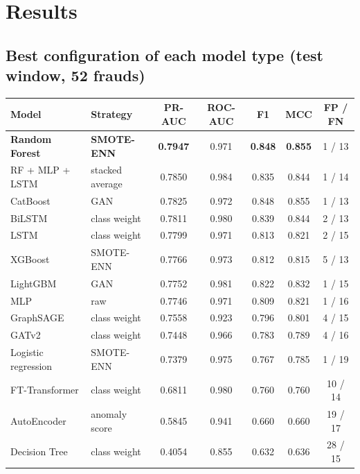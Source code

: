 \documentclass[11pt,a4paper]{article}
\begin{document}
\section{Results}
\subsection{Best configuration of each model type (test window, 52 frauds)}
{\footnotesize
\begin{center}
\begin{tabular}{@{}llccccc@{}}
\toprule
Model & Strategy & PR-AUC & ROC-AUC & F1 & MCC & FP / FN \\
\midrule
\textbf{Random Forest} & \textbf{SMOTE-ENN} & \textbf{0.7947} & 0.971 & \textbf{0.848} & \textbf{0.855} & 1 / 13 \\
RF + MLP + LSTM & stacked average & 0.7850 & 0.984 & 0.835 & 0.844 & 1 / 14 \\
CatBoost & GAN & 0.7825 & 0.972 & 0.848 & 0.855 & 1 / 13 \\
BiLSTM & class weight & 0.7811 & 0.980 & 0.839 & 0.844 & 2 / 13 \\
LSTM & class weight & 0.7799 & 0.971 & 0.813 & 0.821 & 2 / 15 \\
XGBoost & SMOTE-ENN & 0.7766 & 0.973 & 0.812 & 0.815 & 5 / 13 \\
LightGBM & GAN & 0.7752 & 0.981 & 0.822 & 0.832 & 1 / 15 \\
MLP & raw & 0.7746 & 0.971 & 0.809 & 0.821 & 1 / 16 \\
GraphSAGE & class weight & 0.7558 & 0.923 & 0.796 & 0.801 & 4 / 15 \\
GATv2 & class weight & 0.7448 & 0.966 & 0.783 & 0.789 & 4 / 16 \\
Logistic regression & SMOTE-ENN & 0.7379 & 0.975 & 0.767 & 0.785 & 1 / 19 \\
FT-Transformer & class weight & 0.6811 & 0.980 & 0.760 & 0.760 & 10 / 14 \\
AutoEncoder & anomaly score & 0.5845 & 0.941 & 0.660 & 0.660 & 19 / 17 \\
Decision Tree & class weight & 0.4054 & 0.855 & 0.632 & 0.636 & 28 / 15 \\
\bottomrule
\end{tabular}
\end{center}
}
\end{document}
